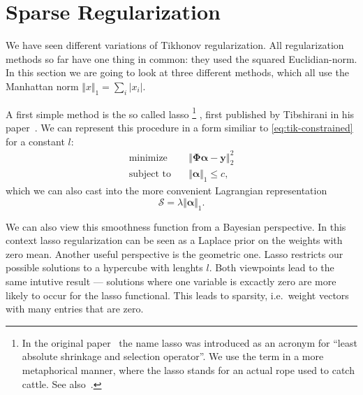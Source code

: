 \section{Sparse Regularization}
We have seen different variations of Tikhonov regularization.
All regularization methods so far have one thing in common: they used the squared Euclidian-norm.
In this section we are going to look at three different methods, which all use the Manhattan norm \(\Vert x \Vert_1  = \sum_i \vert x_i \vert\).

A first simple method is the so called lasso \footnote{In the original
  paper~\cite{lasso} the name lasso  was introduced as an
  acronym for ``least absolute shrinkage and selection operator''.
We use the term in a more metaphorical manner, where the lasso stands for an
actual rope used to catch cattle. See also~\cite{sparse-learning}.}
, first published by Tibshirani in his paper~\cite{lasso}. %
We can represent this procedure in a form similiar to \cref{eq:tik-constrained} for a constant \(l\):
\begin{align}\label{eq:lasso-constrained}
\text{minimize} \quad &
 \left\Vert  \bm{\Phi} \bm{\alpha} - \bm{y}  \right\Vert_2^2 \\
\text{subject to} \quad & \Vert \bm{\alpha}  \Vert_1 \leq c,
\end{align}
which we can also cast into the more convenient Lagrangian representation
\begin{equation*}
\mathcal{S} = \lambda \Vert \bm{\alpha} \Vert_1.
\end{equation*}

We can also view this smoothness function from a Bayesian perspective.
In this context lasso regularization can be seen as a Laplace prior on the
weights with zero mean.
Another useful perspective is the geometric one. Lasso restricts our possible solutions to a hypercube with lenghts \(l\).
Both viewpoints lead to the same intutive result --- 
solutions where one variable is excactly zero are more likely to occur for the
lasso functional.
This leads to sparsity, i.e.~weight vectors with many entries that are zero.

